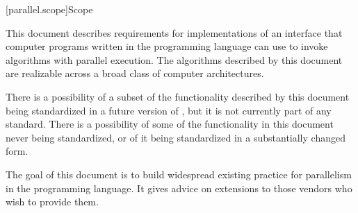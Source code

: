 
[parallel.scope]{Scope}

\pnum
This document describes requirements for implementations of an
interface that computer programs written in the \Cpp programming language can
use to invoke algorithms with parallel execution. The algorithms described by
this document are realizable across a broad class of
computer architectures.

\pnum
There is a possibility of a subset of the functionality described by this
document being standardized in a future version of \Cpp, but it is not
currently part of any \Cpp standard. There is a possibility of some of the
functionality in this document never being standardized, or of it being
standardized in a substantially changed form.

\pnum
The goal of this document is to build widespread existing
practice for parallelism in the \Cpp programming language. It gives
advice on extensions to those vendors who wish to provide them.
